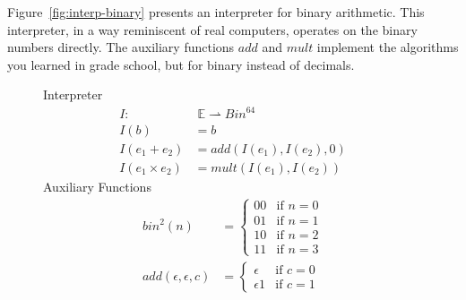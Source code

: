 \documentclass{tufte-handout}
\newcommand{\BR}[1]{(#1)}
\newcommand{\pto}[0]{\rightharpoonup}
\newcommand{\BIN}[0]{\mathit{Bin}}
\newcommand{\EXP}[0]{\mathbb{E}}
\begin{document}
Figure~\ref{fig:interp-binary} presents an interpreter for binary
arithmetic. This interpreter, in a way reminiscent of real computers,
operates on the binary numbers directly. The auxiliary functions
$\mathit{add}$ and $\mathit{mult}$ implement the algorithms you
learned in grade school, but for binary instead of decimals.

\begin{figure}[tbp]
\noindent Interpreter 
\begin{align*}
  I : & \; \EXP \pto \BIN^{64} \\
I\BR{ b } &= b \\
I\BR{ e_1 + e_2 } &=
  \mathit{add}(I\BR{ e_1 }, I\BR{ e_2 },0) \\
I\BR{ e_1 \times e_2 } &=
  \mathit{mult}(I\BR{ e_1 }, I\BR{ e_2 })
\end{align*}
Auxiliary Functions
\begin{align*}
  \mathit{bin}^2(n) &=
  \begin{cases}
     00 &  \text{if } n = 0 \\
     01 &  \text{if } n = 1 \\
     10 &  \text{if } n = 2 \\
     11 &  \text{if } n = 3
  \end{cases}
  \\[2ex]
 \mathit{add}(\epsilon, \epsilon, c) &= 
   \begin{cases}
      \epsilon  & \text{if } c = 0 \\
      \epsilon 1  & \text{if } c = 1
   \end{cases}

\end{align*}
\end{figure}
\end{document}
